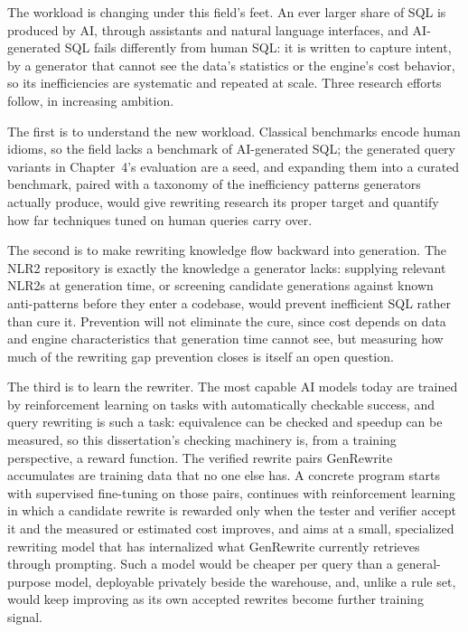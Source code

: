 The workload is changing under this field's feet. An ever larger
share of SQL is produced by AI, through assistants and natural
language interfaces, and AI-generated SQL fails differently from
human SQL: it is written to capture intent, by a generator that
cannot see the data's statistics or the engine's cost behavior, so
its inefficiencies are systematic and repeated at scale. Three
research efforts follow, in increasing ambition.

The first is to understand the new workload. Classical benchmarks
encode human idioms, so the field lacks a benchmark of AI-generated
SQL; the generated query variants in Chapter~4's evaluation are a
seed, and expanding them into a curated benchmark, paired with a
taxonomy of the inefficiency patterns generators actually produce,
would give rewriting research its proper target and quantify how far
techniques tuned on human queries carry over.

The second is to make rewriting knowledge flow backward into
generation. The NLR2 repository is exactly the knowledge a generator
lacks: supplying relevant NLR2s at generation time, or screening
candidate generations against known anti-patterns before they enter
a codebase, would prevent inefficient SQL rather than cure it.
Prevention will not eliminate the cure, since cost depends on data
and engine characteristics that generation time cannot see, but
measuring how much of the rewriting gap prevention closes is itself
an open question.

The third is to learn the rewriter. The most capable AI models
today are trained by reinforcement learning on tasks with
automatically checkable success, and query rewriting is such a task:
equivalence can be checked and speedup can be measured, so this
dissertation's checking machinery is, from a training perspective, a
reward function. The verified rewrite pairs GenRewrite accumulates
are training data that no one else has. A concrete program starts
with supervised fine-tuning on those pairs, continues with
reinforcement learning in which a candidate rewrite is rewarded only
when the tester and verifier accept it and the measured or estimated
cost improves, and aims at a small, specialized rewriting model that
has internalized what GenRewrite currently retrieves through
prompting. Such a model would be cheaper per query than a
general-purpose model, deployable privately beside the warehouse,
and, unlike a rule set, would keep improving as its own accepted
rewrites become further training signal.

